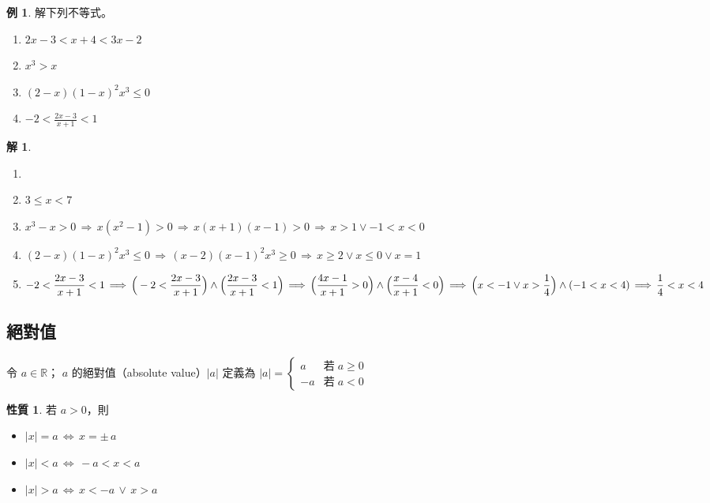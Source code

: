 \documentclass[12pt]{extarticle}
\newcommand{\ds}{\displaystyle}
\newcommand{\ie}{\,\Longrightarrow\,}
\newcommand{\ifff}{\,\Longleftrightarrow\,}
\theoremstyle{definition}
\newtheorem*{prp}{性質}
\newtheorem*{ex}{例}
\newtheorem*{sol}{解}
\begin{document}
\begin{ex}
  解下列不等式。
  \begin{enumerate}\setlength\itemsep{0em}
    \item $\ds 2x - 3 < x + 4 < 3 x - 2$
    \item $\ds x^3 > x$
    \item $\ds (2 - x)(1 - x)^2 x^3 \leqslant 0$
    \item $\ds -2 < \frac{2x - 3}{x + 1} < 1$
  \end{enumerate}
\end{ex}

\begin{sol}
  \begin{enumerate}\setlength\itemsep{0em}
    \item[]
    \item $\ds 3 \leqslant x < 7$
    \item $\ds x^3 - x > 0 \ie x(x^2 - 1) > 0 \ie x(x + 1)(x - 1) > 0 \ie x > 1 \vee -1 < x < 0$
    \item $\ds (2 - x)(1 - x)^2 x^3 \leqslant 0 \ie (x - 2)(x - 1)^2 x^3 \geqslant 0 \ie x\geqslant 2 \vee x\leqslant 0\vee x = 1$
    \item $\ds -2 < \frac{2x - 3}{x + 1} < 1 \ie \Big(-2 < \frac{2x - 3}{x + 1}\Big)\wedge\Big(\frac {2x - 3}{x + 1} < 1\Big) \ie \Big(\frac{4x - 1}{x + 1} > 0\Big) \wedge \Big(\frac{x - 4}{x + 1} < 0\Big) \\ \ie \Big(x < -1 \vee x > \frac{1}{4}\Big) \wedge (-1 < x < 4) \ie \frac{1}{4} < x < 4$
  \end{enumerate}
\end{sol}

\subsection*{絕對值}
令 $a\in\mathbb{R}$； $a$ 的絕對值（absolute value）$|a|$ 定義為 $\ds|a|=\begin{cases} a & \text{若}\;a\geqslant 0 \\ - a&\text{若}\;a < 0\end{cases}$

\begin{prp}
  若 $a > 0$，則
  \begin{itemize}\setlength\itemsep{0em}
    \item $\ds |x| = a \ifff x = \pm\,a$
    \item $\ds |x| < a \ifff -a < x < a$
    \item $\ds |x| > a \ifff x < -a \,\vee\, x > a$
  \end{itemize}
\end{prp}
\end{document}
